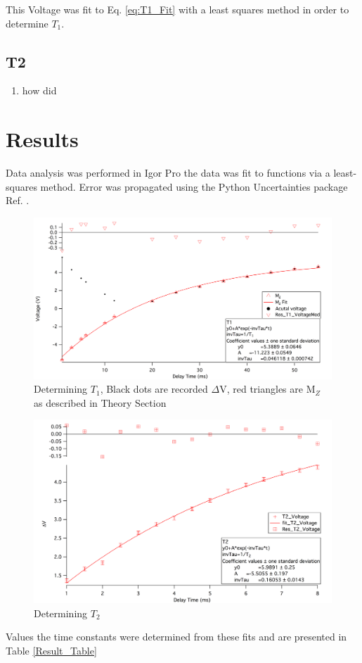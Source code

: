 \documentclass[11pt,letterpaper]{article}
\begin{document}
This Voltage was fit to Eq. \ref{eq:T1_Fit} with a least squares method in order to determine $T_1$.
\subsection{T2}
\begin{enumerate}
\item how did
\end{enumerate}
\section{Results}
Data analysis was performed in Igor Pro the data was fit to functions via a least-squares method. Error was propagated using the Python Uncertainties package Ref. \cite{Uncertainties}.

\begin{figure}[h!]
  \centering
      \includegraphics[scale=.3]{T1_Fit.png}
      \caption{{\small Determining $T_1$, Black dots are recorded $\Delta$V, red triangles are M$_Z$ as described in Theory Section}}
      \label{fig:T1_fit}
\end{figure}	

\begin{figure}
  \centering
      \includegraphics[scale=.3]{T2_Fit.png}
	\caption{Determining $T_2$}
\end{figure}
\FloatBarrier
Values the time constants were determined from these fits and are presented in Table \ref{Result_Table}
\end{document}
